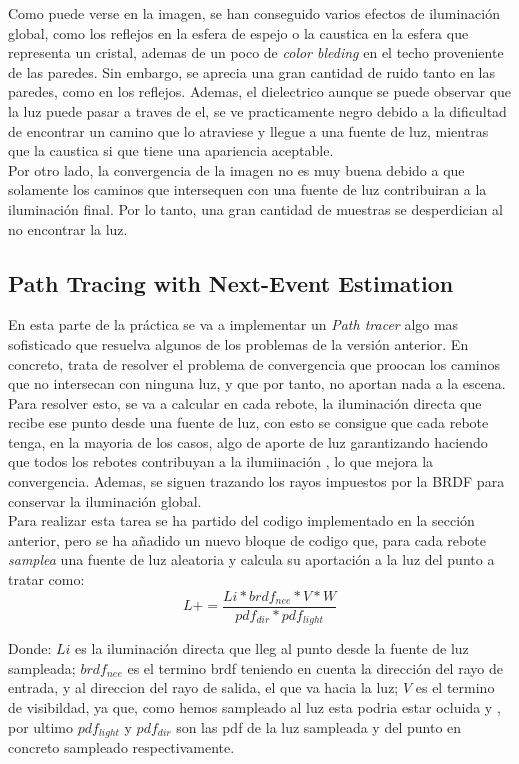 \documentclass[10pt,oneside,a4paper]{article}
\begin{document}
Como puede verse en la imagen, se han conseguido varios efectos de iluminación global, como los reflejos en la esfera de espejo o la caustica en la esfera que representa un cristal, ademas de un poco de \textit{ color bleding} en el techo proveniente de las paredes. Sin embargo, se aprecia una gran cantidad de ruido tanto en las paredes, como en los reflejos. Ademas, el dielectrico aunque se puede observar que la luz puede pasar a traves de el, se ve practicamente negro debido a la dificultad de encontrar un camino que lo atraviese y llegue a una fuente de luz, mientras que la caustica si que tiene una apariencia aceptable.\\

Por otro lado, la convergencia de la imagen no es muy buena debido a que solamente los caminos que intersequen con una fuente de luz contribuiran a la iluminación final. Por lo tanto, una gran cantidad de muestras se desperdician al no encontrar la luz.

\subsection{Path Tracing with Next-Event Estimation}
En esta parte de la práctica se va a implementar un \textit{Path tracer} algo mas sofisticado que resuelva algunos de los problemas de la versión anterior. En concreto, trata de resolver el problema de convergencia que proocan los caminos que no intersecan con ninguna luz, y que por tanto, no aportan nada a la escena. Para resolver esto, se va a calcular en cada rebote, la iluminación directa que recibe ese punto desde una fuente de luz, con esto se consigue que cada rebote tenga, en la mayoria de los casos, algo de aporte de luz garantizando haciendo que todos los rebotes contribuyan a la ilumiinación , lo que mejora la convergencia. Ademas, se siguen trazando los rayos impuestos por la BRDF para conservar la iluminación global.\\

Para realizar esta tarea se ha partido del codigo implementado en la sección anterior, pero se ha añadido un nuevo bloque de codigo que, para cada rebote \textit{samplea} una fuente de luz aleatoria y calcula su aportación a la luz del punto a tratar como:
$$ L += \frac{Li * brdf_{nee} * V * W}{pdf_{dir} * pdf_{light}}$$

Donde: $Li$ es la iluminación directa que lleg al punto desde la fuente de luz sampleada; $brdf_{nee}$ es el termino brdf teniendo en cuenta la dirección del rayo de entrada, y al direccion del rayo de salida, el que va hacia la luz; $V$ es el termino de visibildad, ya que, como hemos sampleado al luz esta podria estar ocluida y , por ultimo $pdf_{light}$ y $pdf_{dir}$ son las pdf de la luz sampleada y del punto en concreto sampleado respectivamente. \\
\end{document}
